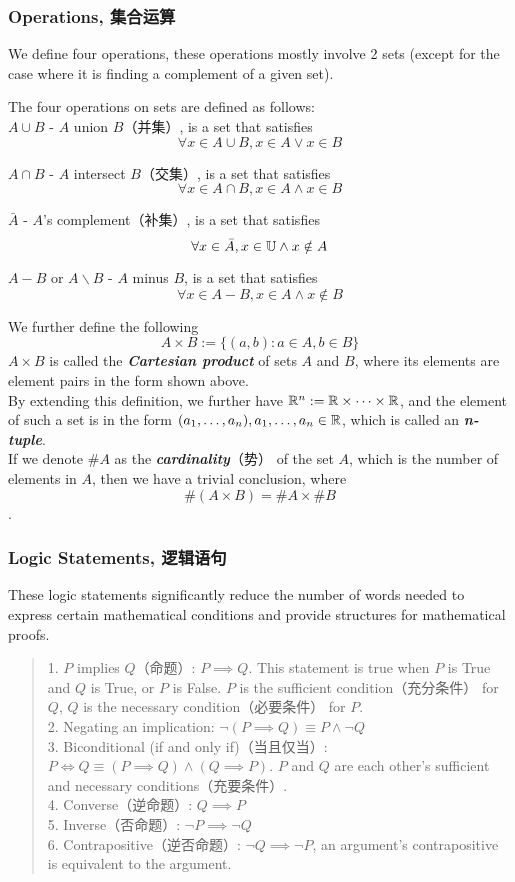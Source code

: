 \subsubsection{Operations, 集合运算}
We define four operations, these operations mostly involve 2 sets (except for the case where it is finding a complement of a given set).
\begin{definition}
    The four operations on sets are defined as follows: \\
    $A \cup B$ - $A$ union $B$（并集）, is a set that satisfies
    $$\forall x \in A \cup B, x \in A \lor x \in B$$

    $A \cap B$ - $A$ intersect $B$（交集）, is a set that satisfies
    $$\forall x \in A \cap B, x \in A \land x \in B$$

    $\bar{A}$ - $A$'s complement（补集）, is a set that satisfies
    $$\forall x \in \bar{A}, x \in \mathbb{U} \land x \notin A$$

    $A - B$ or $A \backslash B$ - $A$ minus $B$, is a set that satisfies
    $$\forall x \in A - B, x \in A \land x \notin B$$
\end{definition}
We further define the following
$$A \times B := \{(a, b): a \in A, b \in B\}$$
$A \times B$ is called the \textbf{\textit{Cartesian product}} of sets $A$ and $B$, where its elements are element pairs in the form shown above. \\
By extending this definition, we further have $\mathbb{R}^n := \mathbb{R} \times \dots \times \mathbb{R}$, and the element of such a set is in the form $(a_1, \dots, a_n), a_1, \dots, a_n \in \mathbb{R}$, which is called an \textbf{\textit{n-tuple}}. \\
If we denote $\# A$ as the \textbf{\textit{cardinality}}（势） of the set $A$, which is the number of elements in $A$, then we have a trivial conclusion, where
$$\# (A \times B) = \# A \times \# B$$.

\subsubsection{Logic Statements, 逻辑语句}
These logic statements significantly reduce the number of words needed to express certain mathematical conditions and provide structures for mathematical proofs.
\begin{quote}
    1. $P$ implies $Q$（命题）: $P \implies Q$. This statement is true when $P$ is True and $Q$ is True, or $P$ is False. $P$ is the sufficient condition（充分条件） for $Q$, $Q$ is the necessary condition（必要条件） for $P$. \\
    2. Negating an implication: $\lnot (P \implies Q) \equiv P \land \lnot Q$ \\
    3. Biconditional (if and only if)（当且仅当）: $P \Longleftrightarrow Q \equiv (P \implies Q) \land (Q \implies P)$. $P$ and $Q$ are each other's sufficient and necessary conditions（充要条件）. \\
    4. Converse（逆命题）: $Q \implies P$ \\
    5. Inverse（否命题）: $\lnot P \implies \lnot Q$ \\
    6. Contrapositive（逆否命题）: $\lnot Q \implies \lnot P$, an argument's contrapositive is equivalent to the argument.
\end{quote}

